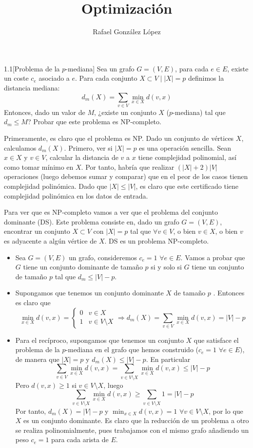 \documentclass[twoside]{article}
\begin{document}
\title{Optimización}
\author{Rafael González López}
\maketitle

\begin{ejercicio}{1.1}[Problema de la $p$-mediana]
Sea un grafo $G=(V,E)$, para cada $e\in E$, existe un coste $c_e$ asociado a $e$. Para cada conjunto $X\subset V \mid |X| = p$ definimos la distancia mediana:
$$
d_m(X) = \sum_{v\in V} \min_{x\in X}d(v,x)
$$
Entonces, dado un valor de $M$, ¿existe un conjunto $X$ ($p$-mediana) tal que $d_m \leq M$? Probar que este problema es NP-completo.
\end{ejercicio}

\begin{solucion}
Primeramente, es claro que el problema es NP. Dado un conjunto de vértices $X$, calculamos $d_m(X)$. Primero, ver si $|X|=p$ es una operación sencilla. Sean $x\in X$ y $v\in V$, calcular la distancia de $v$ a $x$ tiene complejidad polinomial, así como tomar mínimo en $X$. Por tanto, habría que realizar $(|X|+2)|V|$ operaciones (luego debemos sumar y comparar) que en el peor de los casos tienen complejidad polinómica. Dado que $|X|\leq |V|$, es claro que este certificado tiene complejidad polinómica en los datos de entrada.

Para ver que es NP-completo vamos a ver que el problema del conjunto dominante (DS). Este problema consiste en, dado un grafo $G=(V,E)$, encontrar un conjunto $X\subset V$ con $|X|=p$ tal que $\forall v \in V$, o bien $v\in X$, o bien $v$ es adyacente a algún vértice de $X$. DS es un problema NP-completo. \begin{itemize}
\item Sea $G=(V,E)$ un grafo, consideremos $c_e = 1$ $\forall e \in E$. Vamos a probar que $G$ tiene un conjunto dominante de tamaño $p$ si y solo si $G$ tiene un conjunto de tamaño $p$ tal que $d_m \leq |V|-p$.
\item Supongamos que tenemos un conjunto dominante $X$ de tamaño $p$ . Entonces es claro que
$$
\min_{x\in X} d(v,x) = \begin{cases}
 0 & v \in X \\
 1 & v \in V \setminus X
 \end{cases}
 \Rightarrow d_m(X) = \sum_{v\in V}\min_{x\in X}d(v,x) = |V|-p
$$
\item Para el recíproco, supongamos que tenemos un conjunto $X$ que satisface el problema de la $p$-mediana en el grafo que hemos construido ($c_e = 1$ $\forall e \in E)$, de manera que $|X|=p$ y $d_m(X)\leq |V|-p$. En particular
$$
\sum_{v \in V} \min_{x\in X} d(v,x) = \sum_{v \in V\setminus X}  \min_{x\in X} d(v,x) \leq |V|-p
$$
Pero $d(v,x) \geq 1$ si $v\in V\setminus X$, luego 
$$
\sum_{v \in V\setminus X}  \min_{x\in X} d(v,x) \geq \sum_{v \in V\setminus X}  1 = |V|-p
$$
Por tanto, $d_m(X) = |V|-p$ y $\min_{x\in X} d(v,x) = 1$ $\forall v \in V\setminus X$, por lo que $X$ es un conjunto dominante. Es claro que la reducción de un problema a otro se realiza polinomialmente, pues trabajamos con el mismo grafo añadiendo un peso $c_e=1$ para cada arista de $E$.
\end{itemize}
\end{solucion}
\end{document}
